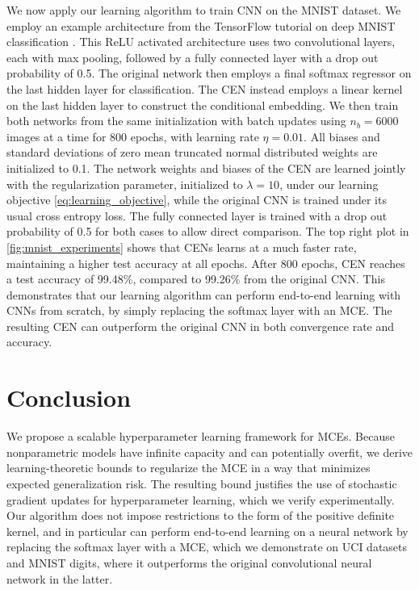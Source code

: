 \documentclass[twoside]{article}
\begin{document}
		We now apply our learning algorithm to train \gls{CNN} on the MNIST dataset. We employ an example architecture from the TensorFlow tutorial on deep MNIST classification \citep{abadi2016tensorflow}. This ReLU activated architecture uses two convolutional layers, each with max pooling, followed by a fully connected layer with a drop out probability of 0.5. The original network then employs a final softmax regressor on the last hidden layer for classification. The \gls{CEN} instead employs a linear kernel on the last hidden layer to construct the conditional embedding. We then train both networks from the same initialization with batch updates using $n_{b} = 6000$ images at a time for 800 epochs, with learning rate $\eta = 0.01$. All biases and standard deviations of zero mean truncated normal distributed weights are initialized to 0.1. The network weights and biases of the \gls{CEN} are learned jointly with the regularization parameter, initialized to $\lambda = 10$, under our learning objective \eqref{eq:learning_objective}, while the original \gls{CNN} is trained under its usual cross entropy loss. The fully connected layer is trained with a drop out probability of 0.5 for both cases to allow direct comparison. The top right plot in \cref{fig:mnist_experiments} shows that \glspl{CEN} learns at a much faster rate, maintaining a higher test accuracy at all epochs. After 800 epochs, \gls{CEN} reaches a test accuracy of 99.48\%, compared to 99.26\% from the original \gls{CNN}. This demonstrates that our learning algorithm can perform end-to-end learning with \glspl{CNN} from scratch, by simply replacing the softmax layer with an \gls{MCE}. The resulting \gls{CEN} can outperform the original \gls{CNN} in both convergence rate and accuracy.
	
	\section{Conclusion}
	
		We propose a scalable hyperparameter learning framework for \glspl{MCE}. Because nonparametric models have infinite capacity and can potentially overfit, we derive learning-theoretic bounds to regularize the \gls{MCE} in a way that minimizes expected generalization risk. The resulting bound justifies the use of stochastic gradient updates for hyperparameter learning, which we verify experimentally. Our algorithm does not impose restrictions to the form of the positive definite kernel, and in particular can perform end-to-end learning on a neural network by replacing the softmax layer with a \gls{MCE}, which we demonstrate on UCI datasets and MNIST digits, where it outperforms the original convolutional neural network in the latter.
		
\end{document}
